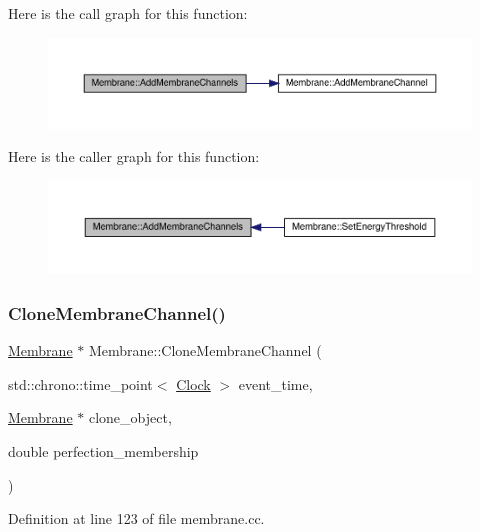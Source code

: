 Here is the call graph for this function\+:
\nopagebreak
\begin{figure}[H]
\begin{center}
\leavevmode
\includegraphics[width=350pt]{class_membrane_aab591875e3266d6c5af0f7c5f7f21e8f_cgraph}
\end{center}
\end{figure}
Here is the caller graph for this function\+:
\nopagebreak
\begin{figure}[H]
\begin{center}
\leavevmode
\includegraphics[width=350pt]{class_membrane_aab591875e3266d6c5af0f7c5f7f21e8f_icgraph}
\end{center}
\end{figure}
\mbox{\label{class_membrane_a9514ca4d4378e6467d2059a9d5f9b99b}} 
\subsubsection{\texorpdfstring{Clone\+Membrane\+Channel()}{CloneMembraneChannel()}}
{\footnotesize\ttfamily \hyperlink{class_membrane}{Membrane} $\ast$ Membrane\+::\+Clone\+Membrane\+Channel (\begin{DoxyParamCaption}\item[{std\+::chrono\+::time\+\_\+point$<$ \hyperlink{universe_8h_a0ef8d951d1ca5ab3cfaf7ab4c7a6fd80}{Clock} $>$}]{event\+\_\+time,  }\item[{\hyperlink{class_membrane}{Membrane} $\ast$}]{clone\+\_\+object,  }\item[{double}]{perfection\+\_\+membership }\end{DoxyParamCaption})}



Definition at line 123 of file membrane.\+cc.

